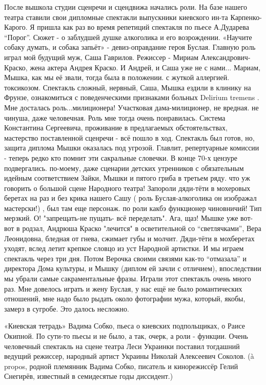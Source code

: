 После вышкола студии сценречи и сцендвижа начались роли. На базе нашего театра
ставили свои  дипломные спектакли выпускники киевского ин-та Карпенко-Карого.
Я пришла как раз во время репетиций спектакля по пьесе А.Дударева \enquote{Порог}.
Сюжет - о заблудшей душке алкоголика и его возрождении. «Научите собаку думать,
и собака запьёт» - девиз-оправдание героя Буслая.  Главную роль играл мой
будущий муж, Саша Гаврилов. Режиссер - Мириам Александрович-Краско, жена актера
Андрея Краско. И Андрей, и Саша уже не с нами... Мариам, Мышка, как мы её
звали, тогда была в положении. с жуткой аллергией. токсикозом. Спектакль
сложный, нервный, Саша, Мышка  ездили в клинику на Фрунзе, ознакомиться с
поведенческими признаками больных Delirium tremens . Мне досталась
роль...милиционера! Участковая дама-милиционер, не вредная. не чинуша, даже
человечная. Роль мне тогда очень понравилась.  Система Константина Сергеевича,
проживание в предлагаемых обстоятельствах, мастерство поставленной сценречи -
всё пошло в ход. Спектакль был готов, но, защита диплома Мышки оказалась под
угрозой. Главлит, репертуарные комиссии - теперь редко кто помнит эти
сакральные словечки. В конце 70-х цензуре подвергались. по-моему, даже сценарии
детских утренников с обязательным идейным соответствием Зайки, Мышки и пятого
гриба в третьем ряду. что уж говорить о большой сцене Народного театра!
Запороли дяди-тёти в мохеровых беретах на раз и без крика нашего Сашу ( роль
Буслая-алкоголика он изображал мастерски!) , был там еще персонаж. по роли
какбэ функционер чиновничий! Тип мерзкий. О! "запрещать-не пущать- всё
переделать". Ага, щаз! Мышке уже вот-вот в родзал, Андрюша Краско "лечится" в
осветительной со \enquote{светлячками}, Вера Леонидовна, бледная от гнева, сжимает
губы и молчит. Дяди-тёти в мохберетах уходят, вслед летит крепкое словцо из уст
Народной артистки. И мы играем спектакль через три дня. Потом Верочка своими
связями как-то \enquote{отмазала} и директора Дома культуры, и Мышку (диплом ей зачли с
отличием),  впоследствии мы убрали самые сакраментальные фразы. Играли этот
спектакль  очень много раз. Мне довелось играть и жену Буслая, у нас ещё не
было романтических отношений, мне надо было рыдать около фотографии мужа,
который, якобы, замерз в сугробе. Это далось несложно.

«Киевская тетрадь» Вадима Собко, пьеса о киевских подпольщиках, о Раисе
Окипной. По сути-то пьесы и не было, а так, очерк, а роли - функции. Очень
человечный спектакль на сцене театра Леси Украинки поставил тогдашний ведущий
режиссер, народный артист Украины Николай Алексеевич Соколов.  (à propos,
родной племянник Вадима Собко, писатель и кинорежиссёр Гелий Снегирёв,
известный в семидесятые годы диссидент.)

